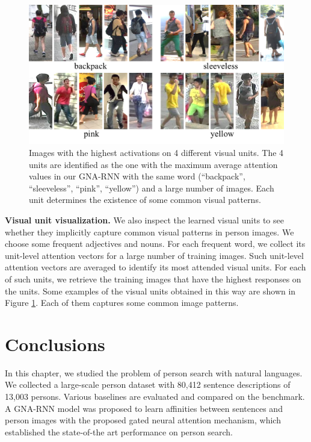 \begin{figure}
\begin{center}
\includegraphics[width=0.9\linewidth]{figures/person_nlp/neuron.pdf}
\end{center}
\vspace{-9pt}
\caption{Images with the highest activations on 4 different visual units. The 4 units are identified as the one with the maximum average attention values in our GNA-RNN with the same word (``backpack'', ``sleeveless'', ``pink'', ``yellow'') and a large number of images. Each unit determines the existence of some common visual patterns.}
\label{fig:units}
\vspace{-8pt}
\end{figure}

{\bf Visual unit visualization.} We also inspect the learned visual units to see whether they implicitly capture common visual patterns in person images. We choose some frequent adjectives and nouns. For each frequent word, we collect its unit-level attention vectors for a large number of training images. Such unit-level attention vectors are averaged to identify its most attended visual units. For each of such units, we retrieve the training images that have the highest responses on the units. Some examples of the visual units obtained in this way are shown in Figure \ref{fig:units}. Each of them captures some common image patterns.
 
\section{Conclusions}
\label{sec:ps-conclusions}
In this chapter, we studied the problem of person search with natural languages. We collected a large-scale person dataset with 80,412 sentence descriptions of 13,003 persons. Various baselines are evaluated and compared on the benchmark. A GNA-RNN model was proposed to learn affinities between sentences and person images with the proposed gated neural attention mechanism, which established the state-of-the art performance on person search.